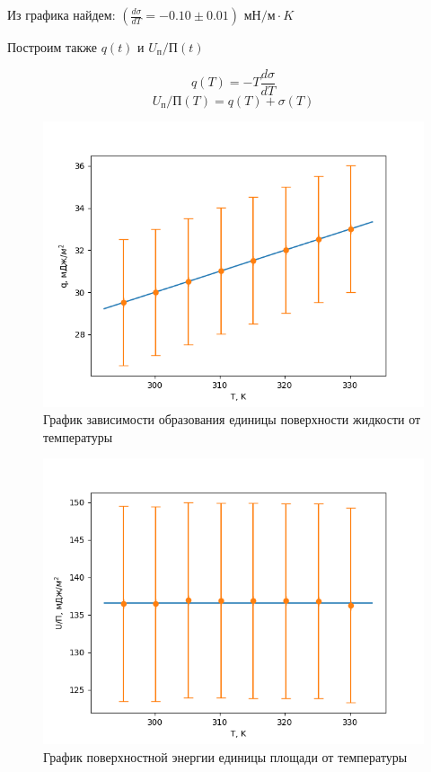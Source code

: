 \documentclass[a4paper]{article}
\begin{document}
Из графика найдем: $(\frac{d\sigma}{dT} = -0.10 \pm 0.01)$ $ \text{мН/м} \cdot K$

Построим также $q(t)$ и $U_\text{п}/\text{П}(t)$

\begin{equation}
    q(T) = -T \frac{d\sigma}{dT}
\end{equation}
\begin{equation}
    U_\text{п}/\text{П}(T) = q(T) + \sigma(T)
\end{equation}

\begin{figure}[h!]
    \center
    \includegraphics[scale=0.8]{q.png}
    \caption{График зависимости образования единицы поверхности жидкости от температуры}
\end{figure}

\begin{figure}[h!]
    \center
    \includegraphics[scale=0.8]{U.png}
    \caption{График поверхностной энергии единицы площади от температуры}
\end{figure}
\end{document}
